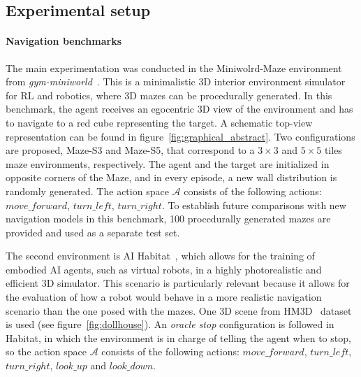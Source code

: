 \subsection{Experimental setup}\label{subsec:experimental-setup}

\paragraph*{Navigation benchmarks}
The main experimentation was conducted in the Miniwolrd-Maze environment from \textit{gym-miniworld}~\cite{gym_miniworld}.
This is a minimalistic 3D interior environment simulator for RL and robotics, where 3D mazes can be procedurally generated.
In this benchmark, the agent receives an egocentric 3D view of the environment and has to navigate to a red cube representing the target.
A schematic top-view representation can be found in figure~\ref{fig:graphical_abstract}.
Two configurations are proposed, Maze-S3 and Maze-S5, that correspond to a $3\times3$ and $5\times5$ tiles maze environments, respectively.
The agent and the target are initialized in opposite corners of the Maze, and in every episode, a new wall distribution is randomly generated.
The action space $\mathcal{A}$ consists of the following actions: $move\_forward$, $turn\_left$, $turn\_right$.
To establish future comparisons with new navigation models in this benchmark, 100 procedurally generated mazes are provided and used as a separate test set.


The second environment is AI Habitat~\cite{szot2021}, which allows for the training of embodied AI agents, such as virtual robots, in a highly photorealistic and efficient 3D simulator.
This scenario is particularly relevant because it allows for the evaluation of how a robot would behave in a more realistic navigation scenario than the one posed with the mazes.
One 3D scene from HM3D~\cite{ramakrishnan2021} dataset is used (see figure~\ref{fig:dollhouse}).
An \textit{oracle stop} configuration is followed in Habitat, in which the environment is in charge of telling the agent when to stop, so the action space $\mathcal{A}$ consists of the following actions: $move\_forward$, $turn\_left$, $turn\_right$, $look\_up$ and $look\_down$.

